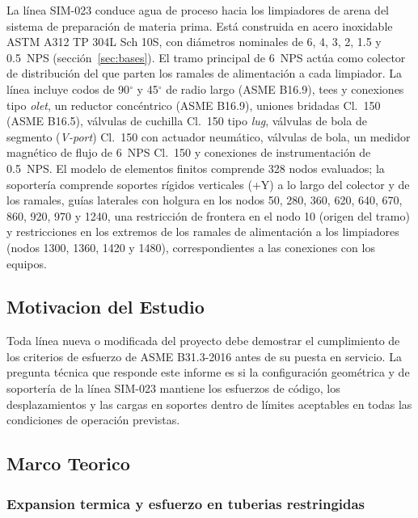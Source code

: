 La l\'{i}nea SIM-023 conduce agua de proceso hacia los limpiadores de arena del
sistema de preparaci\'{o}n de materia prima. Est\'{a} construida en acero
inoxidable ASTM A312 TP 304L Sch 10S, con di\'{a}metros nominales de 6, 4, 3, 2,
1.5 y 0.5~NPS (secci\'{o}n~\ref{sec:bases}). El tramo principal de 6~NPS act\'{u}a
como colector de distribuci\'{o}n del que parten los ramales de alimentaci\'{o}n a
cada limpiador. La l\'{i}nea incluye codos de 90$^\circ$ y 45$^\circ$ de radio
largo (ASME B16.9), tees y conexiones tipo \textit{olet}, un reductor
conc\'{e}ntrico (ASME B16.9), uniones bridadas Cl.~150 (ASME B16.5), v\'{a}lvulas
de cuchilla Cl.~150 tipo \textit{lug}, v\'{a}lvulas de bola de segmento
(\textit{V-port}) Cl.~150 con actuador neum\'{a}tico, v\'{a}lvulas de bola, un
medidor magn\'{e}tico de flujo de 6~NPS Cl.~150 y conexiones de
instrumentaci\'{o}n de 0.5~NPS.
El modelo de elementos finitos comprende 328 nodos
evaluados; la soporter\'{i}a comprende soportes r\'{i}gidos verticales (+Y) a lo
largo del colector y de los ramales, gu\'{i}as laterales con holgura en los nodos
50, 280, 360, 620, 640, 670, 860, 920, 970 y 1240, una restricci\'{o}n de frontera en
el nodo 10 (origen del tramo) y restricciones en los extremos de los ramales de
alimentaci\'{o}n a los limpiadores (nodos 1300, 1360, 1420 y 1480),
correspondientes a las conexiones con los equipos.

\subsection{Motivacion del Estudio}

Toda l\'{i}nea nueva o modificada del proyecto debe demostrar el cumplimiento de
los criterios de esfuerzo de ASME B31.3-2016 antes de su puesta en servicio.
La pregunta t\'{e}cnica que responde este informe es si la configuraci\'{o}n
geom\'{e}trica y de soporter\'{i}a de la l\'{i}nea SIM-023 mantiene los esfuerzos
de c\'{o}digo, los desplazamientos y las cargas en soportes dentro de l\'{i}mites
aceptables en todas las condiciones de operaci\'{o}n previstas.

\subsection{Marco Teorico}
\label{ssec:marco}

\subsubsection{Expansion termica y esfuerzo en tuberias restringidas}

